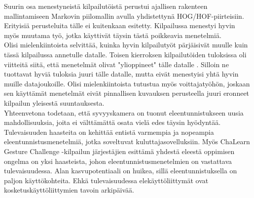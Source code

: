 Suurin osa menestyneistä kilpailutöistä perustui ajallisen rakenteen mallintamiseen Markovin piilomallin avulla yhdistettynä HOG/HOF-piirteisiin. 
Erityisiä perusteluita tälle ei kuitenkaan esitetty. Kilpailussa menestyi hyvin myös muutama työ, jotka käyttivät täysin tästä poikkeavia menetelmiä.\\

Olisi mielenkiintoista selvittää, kuinka hyvin kilpailutyöt pärjäisivät muulle kuin tässä kilpailussa annetulle datalle. 
Toisen kierroksen kilpailutöiden tuloksissa oli viitteitä siitä, että menetelmät olivat "ylioppineet"  tälle datalle \citep {chalearn2}. 
Silloin ne tuottavat hyviä tuloksia juuri tälle datalle, mutta eivät menestyisi yhtä hyvin muille datajoukoille. Olisi mielenkiintoista 
tutustua myös voittajatyöhön, joskaan sen käyttämät menetelmät eivät pinnallisen kuvauksen perusteella juuri eronneet kilpailun yleisestä suuntauksesta.\\

Yhteenvetona todetaan, että syvyyskamera on tuonut eleentunnistukseen uusia mahdollisuuksia, joita ei välttämättä osata vielä edes täysin hyödyntää.
Tulevaisuuden haasteita on kehittää entistä varmempia ja nopeampia eleentunnistusmenetelmiä, jotka soveltuvat kuluttajasovelluksiin.
Myös ChaLearn Gesture Challenge -kilpailun järjestäjien esittämä yhdestä eleestä oppimisen ongelma on yksi haasteista, johon eleentunnistusmenetelmien on 
vastattava tulevaisuudessa. Alan kasvupotentiaali on huikea, sillä eleentunnistuksella on paljon käyttökohteita. Ehkä tulevaisuudessa elekäyttöliittymät
ovat kosketuskäyttöliittymien tavoin arkipäivää. \\








